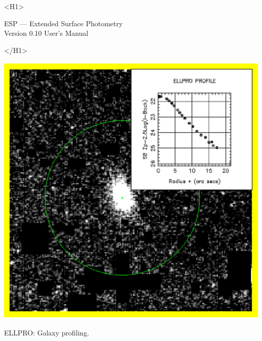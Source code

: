 \documentclass[twoside,11pt]{article}
\newcommand{\stardoctitle}     {ESP --- Extended Surface Photometry}
\newcommand{\stardocversion}   {Version 0.10}
\newcommand{\stardocmanual}    {User's Manual}
\newcommand{\xlabel}[1]{}
\begin{document}
\begin{htmlonly}
   \xlabel{}
   \begin{rawhtml} <H1> \end{rawhtml}
      \stardoctitle\\
      \stardocversion
      \stardocmanual
   \begin{rawhtml} </H1> \end{rawhtml}

   \includegraphics{sun180_diag3.eps}

   \begin{center}
   ELLPRO: Galaxy profiling.
   \end{center}


\end{htmlonly}
\end{document}
